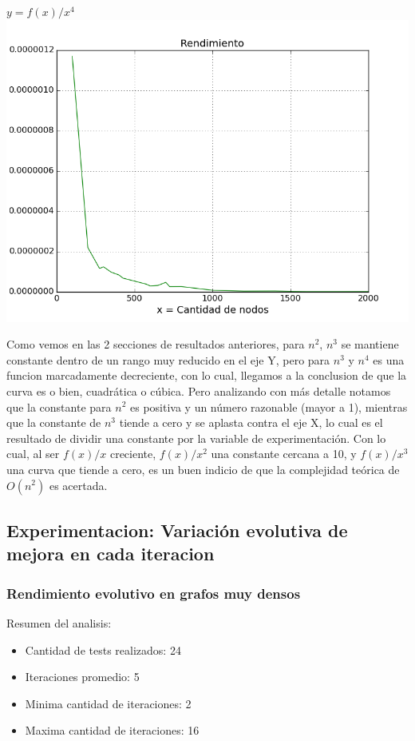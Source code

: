 \begin{center}
	\textbf{$y = f(x)/x^4$}\\
	\includegraphics[scale=0.7]{experimentos/bqlocal/rendimiento_aristas_cuadraticas_3/complexity_med_over_n_fourth.png}
\end{center}

Como vemos en las 2 secciones de resultados anteriores, para $n^2$, $n^3$ se mantiene constante dentro de un rango muy reducido en el eje Y, pero para $n^3$ y $n^4$ es una funcion marcadamente decreciente, con lo cual, llegamos a la conclusion de que la curva es o bien,  cuadr\'atica o c\'ubica. Pero analizando con m\'as detalle notamos que la constante para $n^2$ es positiva y un n\'umero razonable (mayor a 1), mientras que la constante de $n^3$ tiende a cero y se aplasta contra el eje X, lo cual es el resultado de dividir una constante por la variable de experimentaci\'on. Con lo cual, al ser $f(x)/x$ creciente,  $f(x)/x^2$ una constante cercana a 10, y $f(x)/x^3$ una curva que tiende a cero, es un buen indicio de que la complejidad te\'orica de $O(n^2)$ es acertada.


\subsection{Experimentacion: Variaci\'on evolutiva de mejora en cada iteracion}
\subsubsection{Rendimiento evolutivo en grafos muy densos}
Resumen del analisis:
\begin{itemize}
	\item Cantidad de tests realizados: 24
	\item Iteraciones promedio: 5
	\item Minima cantidad de iteraciones: 2
	\item Maxima cantidad de iteraciones: 16
\end{itemize}

